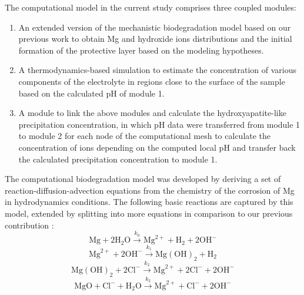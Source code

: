 The computational model in the current study comprises three coupled modules:
\begin{enumerate}
\item
An extended version of the mechanistic biodegradation model based on our previous work \cite{Barzegari2021} to obtain Mg and hydroxide ions distributions and the initial formation of the protective layer based on the modeling hypotheses.
\item
A thermodynamics-based simulation to estimate the concentration of various components of the electrolyte in regions close to the surface of the sample based on the calculated pH of module 1.
\item
A module to link the above modules and calculate the hydroxyapatite-like precipitation concentration, in which pH data were transferred from module 1 to module 2 for each node of the computational mesh to calculate the concentration of ions depending on the computed local pH and transfer back the calculated precipitation concentration to module 1.
\end{enumerate}

The computational biodegradation model was developed by deriving a set of reaction-diffusion-advection equations from the chemistry of the corrosion of Mg in hydrodynamics conditions. The following basic reactions are captured by this model, extended by splitting into more equations in comparison to our previous contribution \cite{Barzegari2021}:\begin{equation} \label{eq:kinetics_oxidation_react1}
\mathrm{Mg}+2 \mathrm{H}_{2} \mathrm{O} \stackrel{k_{0}}{\rightarrow} \mathrm{Mg}^{2+}+\mathrm{H}_{2}+2 \mathrm{OH}^{-}
\end{equation}
\begin{equation} \label{eq:kinetics_oxidation_react2}
\mathrm{Mg}^{2+}+2 \mathrm{OH}^{-} \stackrel{k_{1}}{\rightarrow} \mathrm{Mg}(\mathrm{OH})_{2}+\mathrm{H}_{2}
\end{equation}
\begin{equation} \label{eq:kinetics_break_react}
\mathrm{Mg}(\mathrm{OH})_{2}+2 \mathrm{Cl}^{-} \stackrel{k_{2}}{\rightarrow} \mathrm{Mg}^{2+}+2 \mathrm{Cl}^{-}+2 \mathrm{OH}^{-}
\end{equation}
\begin{equation} \label{eq:kinetics_break_react_mgo}
\mathrm{MgO}+ \mathrm{Cl}^{-} + \mathrm{H}_{2} \mathrm{O} \stackrel{k_{2}}{\rightarrow} \mathrm{Mg}^{2+}+ \mathrm{Cl}^{-}+ 2\mathrm{OH}^{-}
\end{equation}

